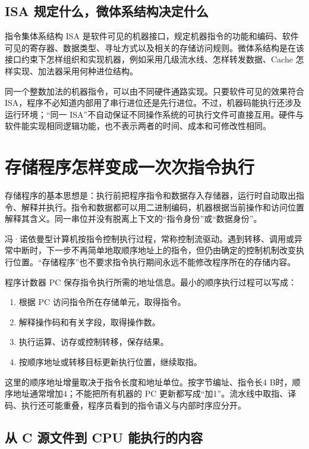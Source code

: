 \subsection{ISA 规定什么，微体系结构决定什么}\label{co-c01-h20}

指令集体系结构 ISA 是软件可见的机器接口，规定机器指令的功能和编码、软件可见的寄存器、数据类型、寻址方式以及相关的存储访问规则。微体系结构是在该接口约束下怎样组织和实现机器，例如采用几级流水线、怎样转发数据、Cache 怎样实现、加法器采用何种进位结构。

同一个整数加法的机器指令，可以由不同硬件通路实现。只要软件可见的效果符合 ISA，程序不必知道内部用了串行进位还是先行进位。不过，机器码能执行还涉及运行环境；``同一 ISA''不自动保证不同操作系统的可执行文件可直接互用。硬件与软件能实现相同逻辑功能，也不表示两者的时间、成本和可修改性相同。

\section{存储程序怎样变成一次次指令执行}\label{co-01-02}

存储程序的基本思想是：执行前把程序指令和数据存入存储器，运行时自动取出指令、解释并执行。指令和数据都可以用二进制编码，机器根据当前操作和访问位置解释其含义。同一串位并没有脱离上下文的``指令身份''或``数据身份''。

冯·诺依曼型计算机按指令控制执行过程，常称控制流驱动。遇到转移、调用或异常中断时，下一步不再简单地取顺序地址上的指令，但仍由确定的控制机制改变执行位置。``存储程序''也不要求指令执行期间永远不能修改程序所在的存储内容。

程序计数器 PC 保存指令执行所需的地址信息。最小的顺序执行过程可以写成：

\begin{enumerate}
\def\labelenumi{\arabic{enumi}.}
\tightlist
\item
  根据 PC 访问指令所在存储单元，取得指令。
\item
  解释操作码和有关字段，取得操作数。
\item
  执行运算、访存或控制转移，保存结果。
\item
  按顺序地址或转移目标更新执行位置，继续取指。
\end{enumerate}

这里的顺序地址增量取决于指令长度和地址单位。按字节编址、指令长4 B时，顺序地址通常增加4；不能把所有机器的 PC 更新都写成``加1''。流水线中取指、译码、执行还可能重叠，程序员看到的指令语义与内部时序应分开。

\subsection{从 C 源文件到 CPU 能执行的内容}\label{co-c01-h41}

